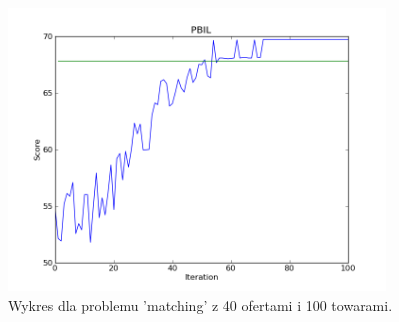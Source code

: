\begin{figure}[!ht]
    \centering
    \includegraphics[width=10cm]{wykresy/matching_bids_100_goods_40_0000_txt_pbil.png}
    \caption{Wykres dla problemu 'matching' z 40 ofertami i 100 towarami.}
    \label{wyk:pbil2}
\end{figure}
